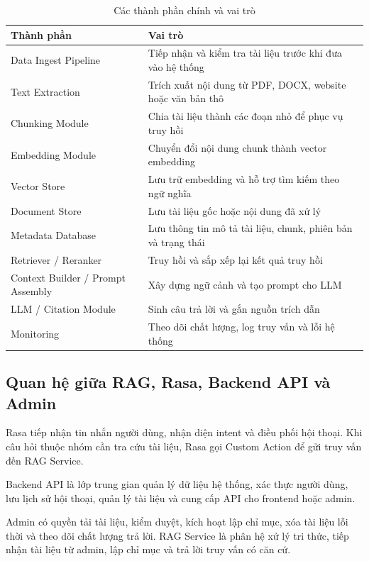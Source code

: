 \begin{table}[H]
\centering
\caption{Các thành phần chính và vai trò}
\begin{tabular}{|p{4.2cm}|p{9.5cm}|}
\hline
\textbf{Thành phần} & \textbf{Vai trò} \\
\hline
Data Ingest Pipeline & Tiếp nhận và kiểm tra tài liệu trước khi đưa vào hệ thống \\
\hline
Text Extraction & Trích xuất nội dung từ PDF, DOCX, website hoặc văn bản thô \\
\hline
Chunking Module & Chia tài liệu thành các đoạn nhỏ để phục vụ truy hồi \\
\hline
Embedding Module & Chuyển đổi nội dung chunk thành vector embedding \\
\hline
Vector Store & Lưu trữ embedding và hỗ trợ tìm kiếm theo ngữ nghĩa \\
\hline
Document Store & Lưu tài liệu gốc hoặc nội dung đã xử lý \\
\hline
Metadata Database & Lưu thông tin mô tả tài liệu, chunk, phiên bản và trạng thái \\
\hline
Retriever / Reranker & Truy hồi và sắp xếp lại kết quả truy hồi \\
\hline
Context Builder / Prompt Assembly & Xây dựng ngữ cảnh và tạo prompt cho LLM \\
\hline
LLM / Citation Module & Sinh câu trả lời và gắn nguồn trích dẫn \\
\hline
Monitoring & Theo dõi chất lượng, log truy vấn và lỗi hệ thống \\
\hline
\end{tabular}
\end{table}

\subsection{Quan hệ giữa RAG, Rasa, Backend API và Admin}

Rasa tiếp nhận tin nhắn người dùng, nhận diện intent và điều phối hội thoại. Khi câu hỏi thuộc nhóm cần tra cứu tài liệu, Rasa gọi Custom Action để gửi truy vấn đến RAG Service.

Backend API là lớp trung gian quản lý dữ liệu hệ thống, xác thực người dùng, lưu lịch sử hội thoại, quản lý tài liệu và cung cấp API cho frontend hoặc admin.

Admin có quyền tải tài liệu, kiểm duyệt, kích hoạt lập chỉ mục, xóa tài liệu lỗi thời và theo dõi chất lượng trả lời. RAG Service là phân hệ xử lý tri thức, tiếp nhận tài liệu từ admin, lập chỉ mục và trả lời truy vấn có căn cứ.

